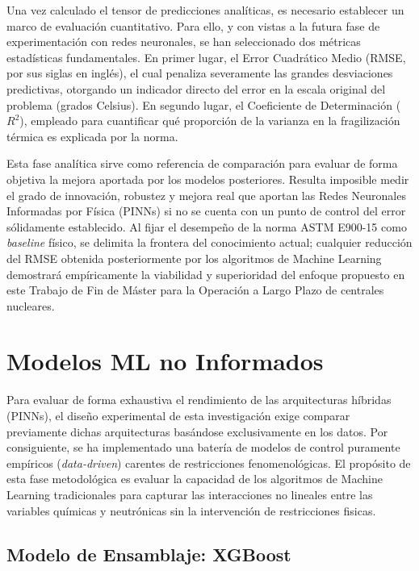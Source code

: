 \documentclass[a4paper, 12pt, twocolumn]{book}
\begin{document}
Una vez calculado el tensor de predicciones analíticas, es necesario establecer un marco de evaluación cuantitativo. Para ello, y con vistas a la futura fase de experimentación con redes neuronales, se han seleccionado dos métricas estadísticas fundamentales. En primer lugar, el Error Cuadrático Medio (RMSE, por sus siglas en inglés), el cual penaliza severamente las grandes desviaciones predictivas, otorgando un indicador directo del error en la escala original del problema (grados Celsius). En segundo lugar, el Coeficiente de Determinación ($R^2$), empleado para cuantificar qué proporción de la varianza en la fragilización térmica es explicada por la norma.

Esta fase analítica sirve como referencia de comparación para evaluar de forma objetiva la mejora aportada por los modelos posteriores. Resulta imposible medir el grado de innovación, robustez y mejora real que aportan las Redes Neuronales Informadas por Física (PINNs) si no se cuenta con un punto de control del error sólidamente establecido. Al fijar el desempeño de la norma ASTM E900-15 como \textit{baseline} físico, se delimita la frontera del conocimiento actual; cualquier reducción del RMSE obtenida posteriormente por los algoritmos de Machine Learning demostrará empíricamente la viabilidad y superioridad del enfoque propuesto en este Trabajo de Fin de Máster para la Operación a Largo Plazo de centrales nucleares.

\section{Modelos ML no Informados}

Para evaluar de forma exhaustiva el rendimiento de las arquitecturas híbridas (PINNs), el diseño experimental de esta investigación exige comparar previamente dichas arquitecturas basándose exclusivamente en los datos. Por consiguiente, se ha implementado una batería de modelos de control puramente empíricos (\textit{data-driven}) carentes de restricciones fenomenológicas. El propósito de esta fase metodológica es evaluar la capacidad de los algoritmos de Machine Learning tradicionales para capturar las interacciones no lineales entre las variables químicas y neutrónicas sin la intervención de restricciones fisicas.

\subsection{Modelo de Ensamblaje: XGBoost}
\end{document}
